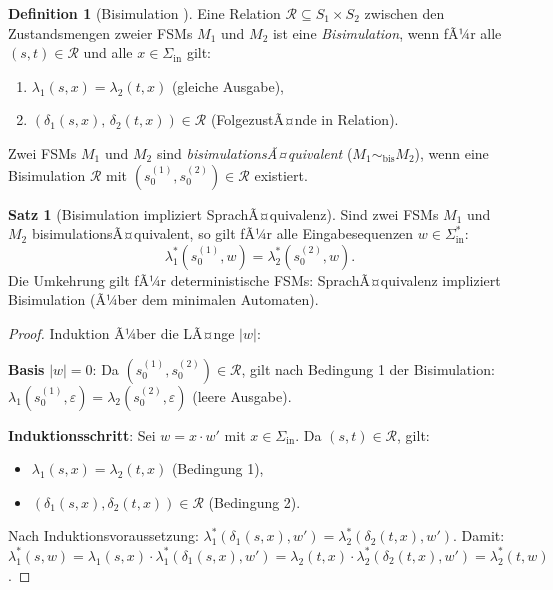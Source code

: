 ﻿\documentclass[a4paper,12pt]{article}
\theoremstyle{definition}
\newtheorem{definition}{Definition}
\newtheorem{satz}{Satz}
\begin{document}
\begin{definition}[Bisimulation \cite{hopcroft1971}]\label{def:bisimulation}
  Eine Relation $\mathcal{R} \subseteq S_1 \times S_2$ zwischen den Zustandsmengen
  zweier FSMs $M_1$ und $M_2$ ist eine \emph{Bisimulation}, wenn fÃ¼r alle
  $(s, t) \in \mathcal{R}$ und alle $x \in \Sigma_{\text{in}}$ gilt:
  \begin{enumerate}
    \item $\lambda_1(s, x) = \lambda_2(t, x)$ \quad (gleiche Ausgabe),
    \item $(\delta_1(s, x),\, \delta_2(t, x)) \in \mathcal{R}$ \quad (FolgezustÃ¤nde in Relation).
  \end{enumerate}
  Zwei FSMs $M_1$ und $M_2$ sind \emph{bisimulationsÃ¤quivalent} ($M_1 \sim_{\text{bis}} M_2$),
  wenn eine Bisimulation $\mathcal{R}$ mit $(s_0^{(1)}, s_0^{(2)}) \in \mathcal{R}$ existiert.
\end{definition}

\begin{satz}[Bisimulation impliziert SprachÃ¤quivalenz]\label{satz:bisimsprache}
  Sind zwei FSMs $M_1$ und $M_2$ bisimulationsÃ¤quivalent, so gilt fÃ¼r alle
  Eingabesequenzen $w \in \Sigma_{\text{in}}^*$:
  \[
    \lambda_1^*(s_0^{(1)}, w) = \lambda_2^*(s_0^{(2)}, w).
  \]
  Die Umkehrung gilt fÃ¼r deterministische FSMs: SprachÃ¤quivalenz impliziert Bisimulation
  (Ã¼ber dem minimalen Automaten).
\end{satz}

\begin{proof}
  Induktion Ã¼ber die LÃ¤nge $|w|$:

  \textbf{Basis} $|w| = 0$: Da $(s_0^{(1)}, s_0^{(2)}) \in \mathcal{R}$, gilt nach
  Bedingung 1 der Bisimulation: $\lambda_1(s_0^{(1)}, \varepsilon) = \lambda_2(s_0^{(2)}, \varepsilon)$
  (leere Ausgabe).

  \textbf{Induktionsschritt}: Sei $w = x \cdot w'$ mit $x \in \Sigma_{\text{in}}$.
  Da $(s, t) \in \mathcal{R}$, gilt:
  \begin{itemize}
    \item $\lambda_1(s, x) = \lambda_2(t, x)$ (Bedingung 1),
    \item $(\delta_1(s, x), \delta_2(t, x)) \in \mathcal{R}$ (Bedingung 2).
  \end{itemize}
  Nach Induktionsvoraussetzung:
  $\lambda_1^*(\delta_1(s,x), w') = \lambda_2^*(\delta_2(t,x), w')$.
  Damit: $\lambda_1^*(s, w) = \lambda_1(s,x) \cdot \lambda_1^*(\delta_1(s,x), w')
  = \lambda_2(t,x) \cdot \lambda_2^*(\delta_2(t,x), w') = \lambda_2^*(t, w)$.
\end{proof}
\end{document}
